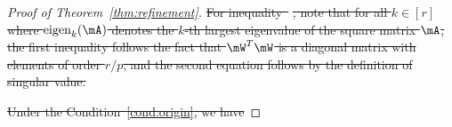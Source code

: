 \documentclass[lettersize,onecolumn,journal]{IEEEtran}
\theoremstyle{definition}
\newtheorem{lem}{Lemma}
\theoremstyle{definition}
\newcommand{\of}[1]{\left(#1\right)}
\newcommand{\aabs}[1]{\left|#1\right|}
\providecommand{\DIFdeltex}[1]{{\protect\color{red}\sout{#1}}}                      %
\providecommand{\DIFdel}[1]{\texorpdfstring{\DIFdeltex{#1}}{}} %
\begin{document}
\begin{proof}[Proof of Theorem~\ref{thm:refinement}]
\DIFdel{For inequality~}%
\DIFdel{, note that for all $k \in [r]$
}%
\DIFdel{where $\text{eigen}_k(\mA)$ denotes the $k$-th largest eigenvalue of the square matrix $\mA$, the first inequality follows the fact that $\mW^T\mW$ is a diagonal matrix with elements of order $r/p$, and the second equation follows by the definition of singular value.
}%

\DIFdel{Under the Condition~\ref{cond:origin}, we have 
    }%


\end{proof}
\end{document}
